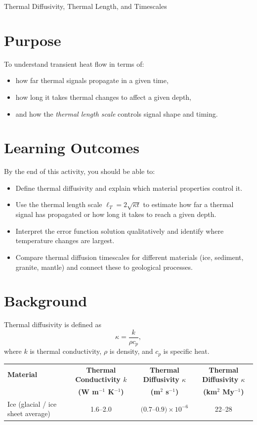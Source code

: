 \begin{activity}{Thermal Diffusivity, Thermal Length, and Timescales}

\section*{Purpose}
To understand transient heat flow in terms of:
\begin{itemize}
  \item how far thermal signals propagate in a given time,
  \item how long it takes thermal changes to affect a given depth,
  \item and how the \emph{thermal length scale} controls signal shape and timing.
\end{itemize}

{\color{red}
\section*{Learning Outcomes}

By the end of this activity, you should be able to:
\begin{itemize}
  \item Define thermal diffusivity and explain which material properties control it.
  \item Use the thermal length scale $\ell_T = 2\sqrt{\kappa t}$ to estimate how far a thermal signal has propagated or how long it takes to reach a given depth.
  \item Interpret the error function solution qualitatively and identify where temperature changes are largest.
  \item Compare thermal diffusion timescales for different materials (ice, sediment, granite, mantle) and connect these to geological processes.
\end{itemize}
}

\section*{Background}
Thermal diffusivity is defined as
\[
\kappa = \frac{k}{\rho c_p},
\]
where $k$ is thermal conductivity, $\rho$ is density, and $c_p$ is specific heat.

\begin{table}
    \centering
    \begin{tabular}{lccc}
        \toprule
        \textbf{Material} &
        \textbf{Thermal Conductivity $k$} &
        \textbf{Thermal Diffusivity $\kappa$} &
        \textbf{Thermal Diffusivity $\kappa$} \\
        &
        \textbf{(W m$^{-1}$ K$^{-1}$)} &
        \textbf{(m$^2$ s$^{-1}$)} &
        \textbf{(km$^2$ My$^{-1}$)} \\
        \midrule
        Ice (glacial / ice sheet average) &
        1.6--2.0 &
        $(0.7$--$0.9)\times10^{-6}$ &
        22--28 \\


\end{tabular}
\end{table}
\end{activity}
